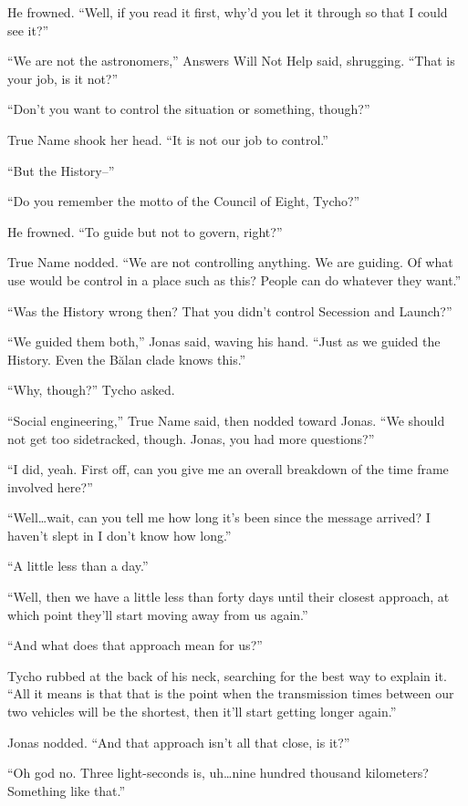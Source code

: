 He frowned. ``Well, if you read it first, why'd you let it through so that I could see it?''

``We are not the astronomers,'' Answers Will Not Help said, shrugging. ``That is your job, is it not?''

``Don't you want to control the situation or something, though?''

True Name shook her head. ``It is not our job to control.''

``But the History--''

``Do you remember the motto of the Council of Eight, Tycho?''

He frowned. ``To guide but not to govern, right?''

True Name nodded. ``We are not controlling anything. We are guiding. Of what use would be control in a place such as this? People can do whatever they want.''

``Was the History wrong then? That you didn't control Secession and Launch?''

``We guided them both,'' Jonas said, waving his hand. ``Just as we guided the History. Even the Bălan clade knows this.''

``Why, though?'' Tycho asked.

``Social engineering,'' True Name said, then nodded toward Jonas. ``We should not get too sidetracked, though. Jonas, you had more questions?''

``I did, yeah. First off, can you give me an overall breakdown of the time frame involved here?''

``Well\ldots wait, can you tell me how long it's been since the message arrived? I haven't slept in I don't know how long.''

``A little less than a day.''

``Well, then we have a little less than forty days until their closest approach, at which point they'll start moving away from us again.''

``And what does that approach mean for us?''

Tycho rubbed at the back of his neck, searching for the best way to explain it. ``All it means is that that is the point when the transmission times between our two vehicles will be the shortest, then it'll start getting longer again.''

Jonas nodded. ``And that approach isn't all that close, is it?''

``Oh god no. Three light-seconds is, uh\ldots nine hundred thousand kilometers? Something like that.''


